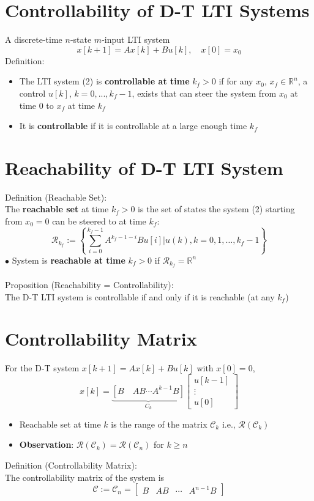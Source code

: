 \documentclass[10pt,a4paper,oneside]{article}
\begin{document}
\section{Controllability of D-T LTI Systems}
A discrete-time $n$-state $m$-input LTI system
\begin{equation}
x[k+1]=A x[k]+B u[k], \quad x[0]=x_{0}
\end{equation}
Definition:
\begin{itemize}
\item The LTI system (2) is {\bfseries controllable at time} $k_f>0$ if for any $x_0$, $x_f\in\mathbb{R}^n$, a control $u[k]$, $k=0,...,k_f-1$, exists that can steer the system from $x_0$ at time 0 to $x_f$ at time $k_f$
\item It is {\bfseries controllable} if it is controllable at a large enough time $k_f$
\end{itemize}
\section{Reachability of D-T LTI System}
Definition (Reachable Set):\\
The {\bfseries reachable set} at time $k_{f}>0$ is the set of states the system (2)
starting from $x_{0}=0$ can be steered to at time $k_{f}$:
\[
\mathcal{R}_{k_{f}} :=\left\{\sum_{i=0}^{k_{f}-1} A^{k_{f}-1-i} B u[i] | u(k), k=0,1, \ldots, k_{f}-1\right\}
\]
$\bullet$ System is {\bfseries reachable at time} $k_f>0$ if $\mathcal{R}_{k_{f}}=\mathbb{R}^{n}$\\
\\Proposition (Reachability = Controllability):\\
The D-T LTI system is controllable if and only if it is reachable (at any $k_f$)
\section{Controllability Matrix}
For the D-T system $x[k+1]=A x[k]+B u[k]$ with $x[0]=0$,
\[
x[k]=\underbrace{\left[B \quad A B \cdots A^{k-1} B\right]}_{C_{k}}\left[\begin{array}{c}{u[k-1]} \\ {\vdots} \\ {u[0]}\end{array}\right]
\]
\begin{itemize}
\item Reachable set at time $k$ is the range of the matrix $\mathcal{C}_{k}$ i.e., $\mathcal{R}\left(\mathcal{C}_{k}\right)$
\item {\bfseries Observation}: $\mathcal{R}\left(\mathcal{C}_{k}\right)=\mathcal{R}\left(\mathcal{C}_{n}\right)$ for $k \geq n$
\end{itemize}
Definition (Controllability Matrix):\\
The controllability matrix of the system is
\[
\mathcal{C} :=\mathcal{C}_{n}=\left[\begin{array}{llll}{B} & {A B} & {\cdots} & {A^{n-1} B}\end{array}\right]
\]
\end{document}
